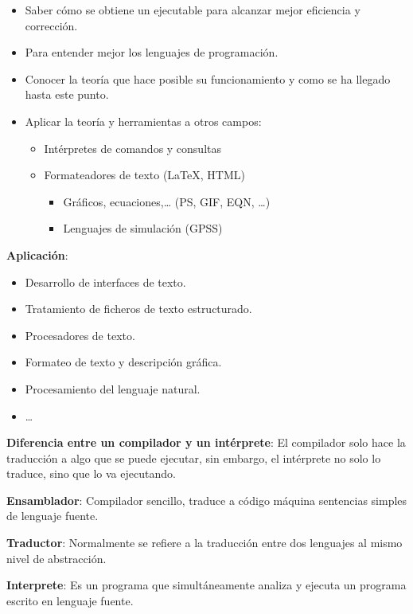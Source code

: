 \documentclass[12pt, twoside, openright]{report} %
\begin{document}
\begin{itemize}
	\item Saber cómo se obtiene un ejecutable para alcanzar mejor eficiencia y
	      corrección.
	\item Para entender mejor los lenguajes de programación.
	\item Conocer la teoría que hace posible su funcionamiento y como se ha
	      llegado hasta este punto.
	\item Aplicar la teoría y herramientas a otros campos:

	      \begin{itemize}
		      \item Intérpretes de comandos y consultas
		      \item Formateadores de texto (LaTeX, HTML)

		            \begin{itemize}
			            \item Gráficos, ecuaciones,\ldots{} (PS, GIF, EQN, \ldots)
			            \item Lenguajes de simulación (GPSS)
		            \end{itemize}
	      \end{itemize}
\end{itemize}
\pagebreak
\textbf{Aplicación}:

\begin{itemize}
	\item Desarrollo de interfaces de texto.
	\item Tratamiento de ficheros de texto estructurado.
	\item Procesadores de texto.
	\item Formateo de texto y descripción gráfica.
	\item Procesamiento del lenguaje natural.
	\item \ldots{}
\end{itemize}

\textbf{Diferencia entre un compilador y un intérprete}: El compilador solo
hace la traducción a algo que se puede ejecutar, sin embargo, el
intérprete no solo lo traduce, sino que lo va ejecutando.

\textbf{Ensamblador}: Compilador sencillo, traduce a código máquina
sentencias simples de lenguaje fuente.

\textbf{Traductor}: Normalmente se refiere a la traducción entre dos
lenguajes al mismo nivel de abstracción.

\textbf{Interprete}: Es un programa que simultáneamente analiza y
ejecuta un programa escrito en lenguaje fuente.
\end{document}
